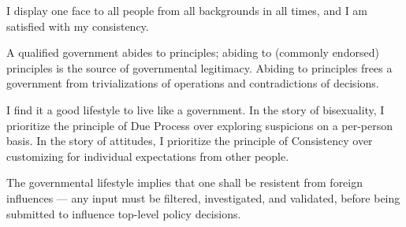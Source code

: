 \begin{multicols*}{2}
    I display one face to all people from all backgrounds in all times,
    and I am satisfied with my consistency.

    A qualified government abides to principles; abiding to (commonly endorsed) principles is the source of governmental legitimacy.
    Abiding to principles frees a government from trivializations of operations and contradictions of decisions.

    I find it a good lifestyle to live like a government.
    In the story of bisexuality, I prioritize the principle of Due Process over exploring suspicions on a per-person basis.
    In the story of attitudes, I prioritize the principle of Consistency over customizing for individual expectations from other people.

    The governmental lifestyle implies that one shall be resistent from foreign influences ---
    any input must be filtered, investigated, and validated, before being submitted to influence top-level policy decisions.
    
\end{multicols*}

